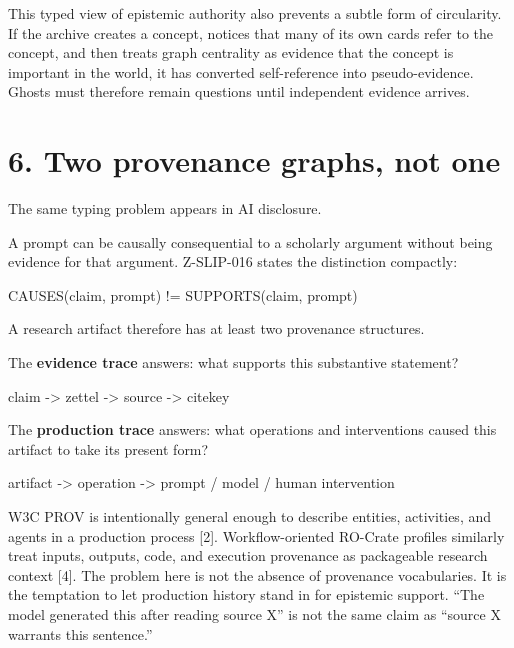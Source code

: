 \documentclass[
  11pt,
]{article}
\newenvironment{Shaded}{}{}
\newcommand{\NormalTok}[1]{#1}
\begin{document}
This typed view of epistemic authority also prevents a subtle form of
circularity. If the archive creates a concept, notices that many of its
own cards refer to the concept, and then treats graph centrality as
evidence that the concept is important in the world, it has converted
self-reference into pseudo-evidence. Ghosts must therefore remain
questions until independent evidence arrives.

\section{6. Two provenance graphs, not
one}\label{two-provenance-graphs-not-one}

The same typing problem appears in AI disclosure.

A prompt can be causally consequential to a scholarly argument without
being evidence for that argument. Z-SLIP-016 states the distinction
compactly:

\begin{Shaded}
\begin{Highlighting}[]
\NormalTok{CAUSES(claim, prompt) != SUPPORTS(claim, prompt)}
\end{Highlighting}
\end{Shaded}

A research artifact therefore has at least two provenance structures.

The \textbf{evidence trace} answers: what supports this substantive
statement?

\begin{Shaded}
\begin{Highlighting}[]
\NormalTok{claim {-}\textgreater{} zettel {-}\textgreater{} source {-}\textgreater{} citekey}
\end{Highlighting}
\end{Shaded}

The \textbf{production trace} answers: what operations and interventions
caused this artifact to take its present form?

\begin{Shaded}
\begin{Highlighting}[]
\NormalTok{artifact {-}\textgreater{} operation {-}\textgreater{} prompt / model / human intervention}
\end{Highlighting}
\end{Shaded}

W3C PROV is intentionally general enough to describe entities,
activities, and agents in a production process {[}2{]}.
Workflow-oriented RO-Crate profiles similarly treat inputs, outputs,
code, and execution provenance as packageable research context {[}4{]}.
The problem here is not the absence of provenance vocabularies. It is
the temptation to let production history stand in for epistemic support.
``The model generated this after reading source X'' is not the same
claim as ``source X warrants this sentence.''
\end{document}
